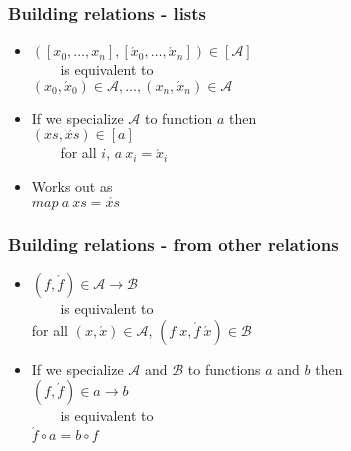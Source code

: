 \documentclass{beamer}
\begin{document}
\begin{frame}[fragile]
    \frametitle{Building relations - lists}

\begin{itemize}
    \item 
        $([x_0, \ldots, x_n],[\acute{x}_0, \ldots, \acute{x}_n]) \in [\mathcal{A}]$ \\
        \verb?    ?is equivalent to \\
        $(x_0, \acute{x}_0) \in \mathcal{A}, \ldots, (x_n, \acute{x}_n) \in \mathcal{A}$
    \item If we specialize $\mathcal{A}$ to function $a$ then \\
        $(xs,\acute{xs}) \in [a]$ \\
        \verb?    ?for all $i$, $a\ x_i = \acute{x}_i$ 
    \item Works out as \\
        $map\ a\ xs = \acute{xs}$
\end{itemize}

\end{frame}

\begin{frame}[fragile]
    \frametitle{Building relations - from other relations}

\begin{itemize}
    \item
        $(f, \acute{f}) \in \mathcal{A} \rightarrow \mathcal{B}$ \\
        \verb?    ?is equivalent to \\
        for all $(x, \acute{x}) \in \mathcal{A}$, $(f\ x, \acute{f}\ \acute{x}) \in \mathcal{B}$
    \item If we specialize $\mathcal{A}$ and $\mathcal{B}$ to functions $a$ and $b$ then \\
        $(f,\acute{f}) \in a \rightarrow b$ \\
        \verb?    ?is equivalent to \\
        $\acute{f} \circ a = b \circ f$
\end{itemize}

\end{frame}
\end{document}
